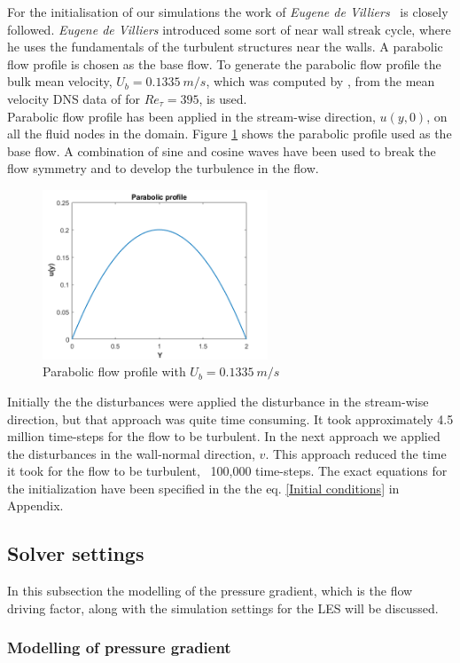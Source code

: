 For the initialisation of our simulations the work of \emph{Eugene de Villiers}~\cite{devilliers:phd} is closely followed. \emph{Eugene de Villiers} introduced some sort of near wall streak cycle, where he uses the fundamentals of the turbulent structures near the walls. A parabolic flow profile is chosen as the base flow. To generate the parabolic flow profile the bulk mean velocity, $U_b = 0.1335\ m/s$, which was computed by \cite{devilliers:phd}, from the mean velocity DNS data of \cite{moser:kim:mansour:99} for $Re_\tau = 395$, is used.\\

Parabolic flow profile has been applied in the stream-wise direction, $u(y,0)$,  on all the fluid nodes in the domain. Figure \ref{para profile} shows the parabolic profile used as the base flow. A combination of sine and cosine waves have been used to break the flow symmetry and to develop the turbulence in the flow. 
%
\begin{figure}[h]
    \centering
    \includegraphics[width=0.6\textwidth]{figur/Parabolic_profile.png}
    \caption{Parabolic flow profile with $U_b = 0.1335\ m/s$}
    \label{para profile}
\end{figure}
Initially the the disturbances were applied the disturbance in the stream-wise direction, but that approach was quite time consuming. It took approximately 4.5 million time-steps for the flow to be turbulent. In the next approach we applied the disturbances in the wall-normal direction, $v$. This approach reduced the time it took for the flow to be turbulent, ~100,000 time-steps. The exact equations for the initialization have been specified in the the eq. \ref{Initial conditions} in Appendix.

\subsection{Solver settings}
In this subsection the modelling of the pressure gradient, which is the flow driving factor, along with the simulation settings for the LES will be discussed.

\subsubsection{Modelling of pressure gradient}


 
